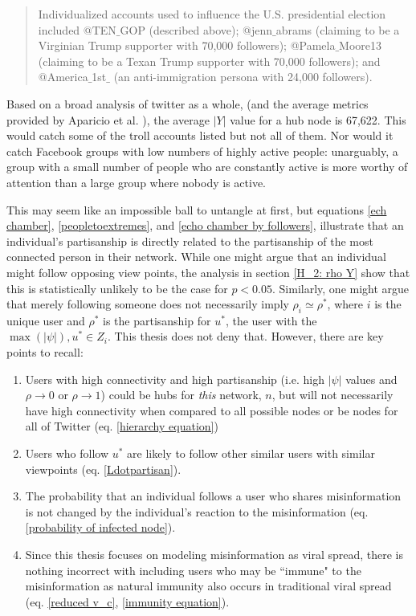 \documentclass[preprint,review,12pt]{elsarticle}
\begin{document}
\begin{quote}
Individualized accounts used to influence the U.S. presidential election included @TEN$\_$GOP (described above); @jenn$\_$abrams (claiming to be a Virginian Trump supporter with 70,000 followers); @Pamela$\_$Moore13 (claiming to be a Texan Trump supporter with 70,000
followers); and @America$\_$1st$\_$ (an anti-immigration persona with 24,000 followers). \cite{mueller2019mueller}
\end{quote}

Based on a broad analysis of twitter as a whole, (and the average metrics provided by Aparicio et al. \cite{aparicio2015model}), the average $|Y|$ value for a hub node is 67,622. This would catch some of the troll accounts listed but not all of them. Nor would it catch Facebook groups with low numbers of highly active people: unarguably, a group with a small number of people who are constantly active is more worthy of attention than a large group where nobody is active.

This may seem like an impossible ball to untangle at first, but equations \ref{ech chamber}, \ref{peopletoextremes}, and \ref{echo chamber by followers}, illustrate that an individual's partisanship is directly related to the partisanship of the most connected person in their network. While one might argue that an individual might follow opposing view points, the analysis in section \ref{H_2: rho Y} show that this is statistically unlikely to be the case for $p < 0.05$. Similarly, one might argue that merely following someone does not necessarily imply $\rho_i \simeq \rho^*$, where $i$ is the unique user and $\rho^*$ is the partisanship for $u^*$, the user with the $\max(|\psi|), u^* \in Z_i$. This thesis does not deny that. However, there are key points to recall:
\begin{enumerate}
    \item Users with high connectivity and high partisanship (i.e. high $|\psi|$ values and $\rho \rightarrow 0$ or $\rho \rightarrow 1$) could be hubs for \textit{this} network, $n$, but will not necessarily have high connectivity when compared to all possible nodes or be nodes for all of Twitter (eq. \ref{hierarchy equation}) 
    \item Users who follow $u^*$ are likely to follow other similar users with similar viewpoints (eq. \ref{Ldotpartisan}).
    \item The probability that an individual follows a user who shares misinformation is not changed by the individual's reaction to the misinformation (eq. \ref{probability of infected node}).
    \item Since this thesis focuses on modeling misinformation as viral spread, there is nothing incorrect with including users who may be ``immune" to the misinformation as natural immunity also occurs in traditional viral spread (eq. \ref{reduced v_c}, \ref{immunity equation}).
\end{enumerate}
\end{document}
